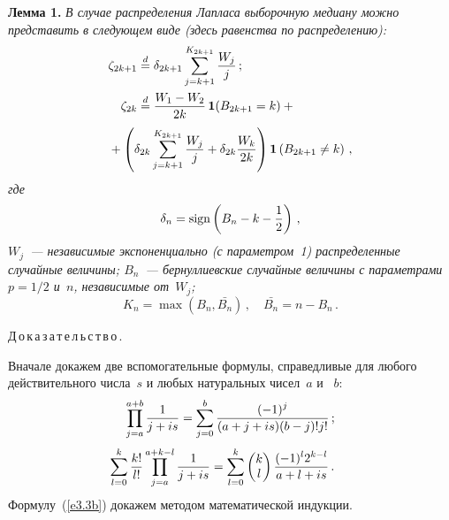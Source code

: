 \begin{multicols}{2}
\noindent
\textbf{Лемма 1.}
{\it В случае распределения Лапласа выборочную медиану
можно представить в следующем виде (здесь равенства по распределению):
\begin{align}
\zeta_{2k+1} &\stackrel{d}{=}\delta_{2k+1}
\sum\limits_{j=k+1}^{K_{2k+1}}{\fr{W_j}{j}}\,;
\label{e3.1b}\\
\zeta_{2k}&\stackrel{d}{=}\fr{W_1-W_2}{2k}\,\mathbf{1}(B_{2k+1}=k)+{}\notag\\[1pt]
&\!\!\!\!\!\!\!\!\!\!\!\!\!\!{}+
\left(\delta_{2k}\sum\limits_{j=k+1}^{K_{2k+1}}\fr{W_j}{j}+
\delta_{2k}\fr{W_k}{2k}\right)\mathbf{1}\left(B_{2k+1} \ne k\right)\,,
\label{e3.2b}
\end{align}
где
$$
\delta_n=\mathrm{sign}\left(B_n-k-\displaystyle\frac{\displaystyle 1\mathstrut}{\displaystyle 2\mathstrut}\right)\,,
$$
$W_j$~--- независимые экспоненциально (с параметром~1) распределенные
случайные величины; $B_n$~--- бернуллиевские случайные величины с параметрами
$p=1/2$ и~$n$, независимые от~$W_j$;
\begin{equation*}
K_n = \max\left(B_n, \bar{B_n}\right)\,,\quad
\bar{B_n}= n - B_n\,.
\end{equation*}
}

\smallskip

\noindent
Д\,о\,к\,а\,з\,а\,т\,е\,л\,ь\,с\,т\,в\,о\,.

Вначале докажем две вспомогательные формулы, справедливые для любого
действительного чис\-ла~$s$
и любых натуральных чисел~$a$ и~ $b$:
\begin{gather}
\prod\limits_{j=a}^{a+b}{\fr{1}{j+is}}=
\sum\limits_{j=0}^b \fr{(-1)^j}{(a+j+is)(b-j)!j!}\,;
\label{e3.3b}
\\[3pt]
\!\!\!\!\!\!\!\!\sum\limits_{l=0}^k\fr{k!}{l!} \prod\limits_{j=a}^{a+k-l}\fr{1}{j+is}=
\sum\limits_{l=0}^k \begin{pmatrix}
k\\ l\end{pmatrix}
\fr{(-1)^l 2^{k-l}}{a+l+is}\,.
\label{e3.4b}
\end{gather}
Формулу~(\ref{e3.3b}) докажем методом математической индукции.


\end{multicols}
